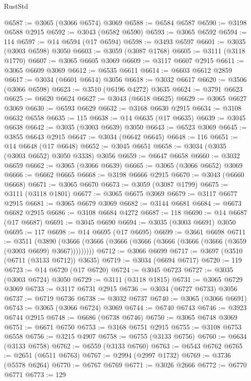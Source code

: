 \begin{lexlean}{RustStd}
\begin{coremodule}
@6587 := @3065 (@3066 @6574) @3069
@6588 := @6584 @6587
@6590 := @3198 @6588 @2915
@6592 := @3043 (@6582 @6590)
@6593 := @3065 @6592
@6594 := 114
@6597 := @14 @6594 (@17 @6594)
@6598 := @3493 @6597
@6601 := @3035 (@3003 @6598) @3050
@6603 := @3059 (@3087 @1768)
@6605 := @3111 (@3118 @1770)
@6607 := @3065 @6605 @3069
@6609 := @3117 @6607 @2915
@6611 := @3065 @6609 @3069
@6612 := @6535 @6611
@6614 := @6603 @6612 @2859
@6617 := @3034 (@6601 @6614) @3056
@6618 := @3032 @6617
@6620 := @3506 (@3066 @6598)
@6623 := @3510 (@6196 @4272) @3635
@6624 := @3791 @6623
@6625 := @6620 @6624
@6627 := @3043 (@6618 @6625)
@6629 := @3065 @6627 @3069
@6630 := @6593 @6629
@6632 := @3168 @6630 @2915
@6634 := @3108 @6632 @6558
@6635 := 115
@6638 := @14 @6635 (@17 @6635)
@6639 := @3045 @6638
@6642 := @3035 (@3003 @6639) @3050
@6643 := @6523 @3069
@6645 := @3855 @6643 @2915
@6647 := @3034 (@6642 @6645)
@6648 := 116
@6651 := @14 @6648 (@17 @6648)
@6652 := @3045 @6651
@6658 := @3034 (@3035 (@3003 @6652) @3050 @3338) @3056
@6659 := @6647 @6658
@6660 := @3032 @6659
@6662 := @3065 (@3066 @6639)
@6665 := @3065 (@3066 @6652) @3069
@6666 := @6662 @6665
@6668 := @3198 @6666 @2915
@6670 := @3043 (@6660 @6668)
@6671 := @3065 @6670
@6673 := @3059 (@3087 @1799)
@6675 := @3111 (@3118 @1801)
@6677 := @3065 @6675 @3069
@6679 := @3117 @6677 @2915
@6681 := @3065 @6679 @3069
@6682 := @3144 @6681
@6684 := @6673 @6682 @2915
@6686 := @3108 @6684 @4272
@6687 := 118
@6690 := @14 @6687 (@17 @6687)
@6691 := @3045 @6690
@6694 := @3035 (@3003 @6691) @3050
@6695 := 117
@6698 := @14 @6695 (@17 @6695)
@6699 := @3661 @6698
@6711 := @3511
    (@3890 (@3666 (@3666 (@3666 (@3666 (@3666 (@3666 (@3666 (@3659 (@3003 @6699) @3667)))))))))
@6712 := @3066 @6699
@6717 := @3697 (@3510 (@6711 (@3133 @6712)) @3635)
@6719 := @3034 (@6694 @6717)
@6720 := 119
@6723 := @14 @6720 (@17 @6720)
@6724 := @3045 @6723
@6727 := @3035 (@3003 @6724) @3050
@6729 := @3111 (@3118 @1815)
@6731 := @3065 @6729 @3069
@6733 := @3117 @6731 @2915
@6736 := @3034 (@6727 @6733) @3056
@6737 := @6719 @6736
@6738 := @3032 @6737
@6740 := @3065 (@3066 @6691)
@6743 := @3065 (@3066 @6724) @3069
@6744 := @6740 @6743
@6746 := @3923 @6744 @2915
@6748 := @6686 (@6738 @6746)
@6750 := @3065 @6748 @3069
@6751 := @6671 @6750
@6753 := @3168 @6751 @2915
@6755 := @3108 @6753 @6558
@6756 := @3215 @4907
@6758 := @6755 (@3133 @6756)
@6760 := @6634 (@3133 @6758)
@6762 := @6559 (@3133 @6760)
@6763 := @6543 @6762
@6765 := @2651 (@6511 @6763)
@6767 := @2994 (@2997 @1732)
@6769 := @3736 (@5578 @6264)
@6770 := @6767 @6769
@6771 := @3026 @2666
@6772 := @6770 @6771
@6773 := 129

\end{coremodule}
\end{lexlean}
